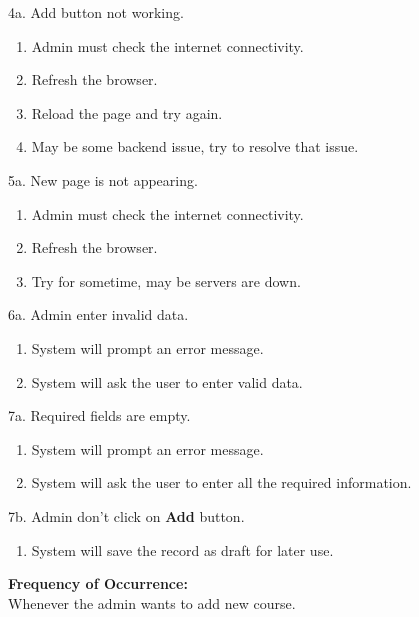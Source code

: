 \documentclass[12pt]{article}
\begin{document}
4a. Add button not working.
\begin{enumerate}
\item Admin must check the internet connectivity.
\item Refresh the browser.
\item Reload the page and try again.
\item May be some backend issue, try to resolve that issue.
\end{enumerate}
5a. New page is not appearing.
\begin{enumerate}
\item Admin must check the internet connectivity.
\item Refresh the browser.
\item Try for sometime, may be servers are down.
\end{enumerate}
6a. Admin enter invalid data.
\begin{enumerate}
\item System will prompt an error message.
\item System will ask the user to enter valid data.
\end{enumerate}
7a. Required fields are empty.
\begin{enumerate}
\item System will prompt an error message.
\item System will ask the user to enter all the required information.
\end{enumerate}
7b. Admin don't click on \textbf{Add} button.
\begin{enumerate}
\item System will save the record as draft for later use.
\end{enumerate}
\textbf{Frequency of Occurrence:}\\
Whenever the admin wants to add new course.
\end{document}

